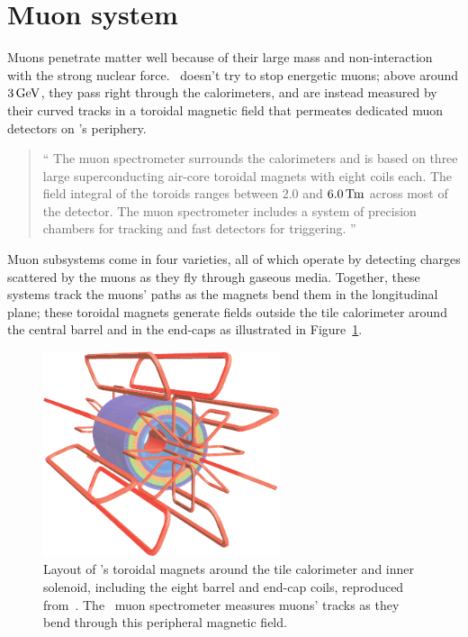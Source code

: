 \section{Muon system}
\label{sec:atlas_muon}
Muons penetrate matter well because of their large mass and non-interaction
with the strong nuclear force.
\atlas\ doesn't try to stop energetic muons;
above around $3\,\eV[G]$, they pass right through the calorimeters, and are
instead measured by their curved tracks in a toroidal magnetic field that
permeates dedicated muon detectors on \atlas's periphery.
\begin{quote}
``%
The muon spectrometer surrounds the calorimeters and is based on three large
superconducting air-core toroidal magnets with eight coils each.
The field integral of the toroids ranges between $2.0$ and
$6.0\,\mathrm{T\kern-0.15ex m}$ across most of the detector.
The muon spectrometer includes a system of precision chambers for tracking and
fast detectors for triggering.%
''~\cite{atlas2022searches}
\end{quote}
Muon subsystems come in four varieties, all of which operate by detecting
charges scattered by the muons as they fly through gaseous media.
Together, these systems track the muons' paths as the magnets bend them in the
longitudinal plane; these toroidal magnets generate fields outside the tile
calorimeter around the central barrel and in the end-caps as illustrated in
Figure~\ref{fig:atlas_magnets}.

\begin{figure}[tp]
\centering
\includegraphics[width=0.62\textwidth]{figures/atlas_magnets.pdf}
\caption[
Layout of \atlas's toroidal magnets around the tile calorimeter and inner
solenoid
]{%
Layout of \atlas's toroidal magnets around the tile calorimeter and inner
solenoid, including the eight barrel and end-cap coils,
reproduced from~\cite{atlas2008experiment}.
The \atlas\ muon spectrometer measures muons' tracks as they bend through
this peripheral magnetic field.
}
\label{fig:atlas_magnets}
\end{figure}

